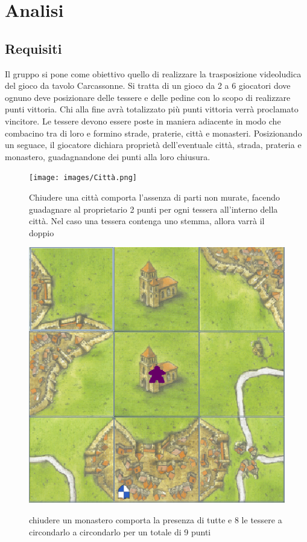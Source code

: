 \section{Analisi}
\subsection{Requisiti}

Il gruppo si pone come obiettivo quello di realizzare la trasposizione videoludica del gioco da tavolo Carcassonne. Si tratta di un gioco da 2 a 6 giocatori dove ognuno deve posizionare delle tessere e delle pedine con lo scopo di realizzare punti vittoria. Chi alla fine avrà totalizzato più punti vittoria verrà proclamato vincitore. Le tessere devono essere poste in maniera adiacente in modo che combacino tra di loro e formino strade, praterie, città e monasteri. Posizionando un seguace, il giocatore dichiara proprietà dell'eventuale città, strada, prateria e monastero, guadagnandone dei punti alla loro chiusura.

\begin{figure}[]
    {\texttt{[image: images/Città.png]}}

    \caption{Chiudere una città comporta l’assenza di parti non murate, facendo guadagnare al proprietario 2 punti per ogni tessera all'interno della città. Nel caso una tessera contenga uno stemma, allora varrà il doppio}
\end{figure}

\begin{figure}[]
    {\includegraphics[]{images/MonasteroMeeple.png}}

    \caption{chiudere un monastero comporta la presenza di tutte e 8 le tessere a circondarlo a circondarlo per un totale di 9 punti}
\end{figure}

